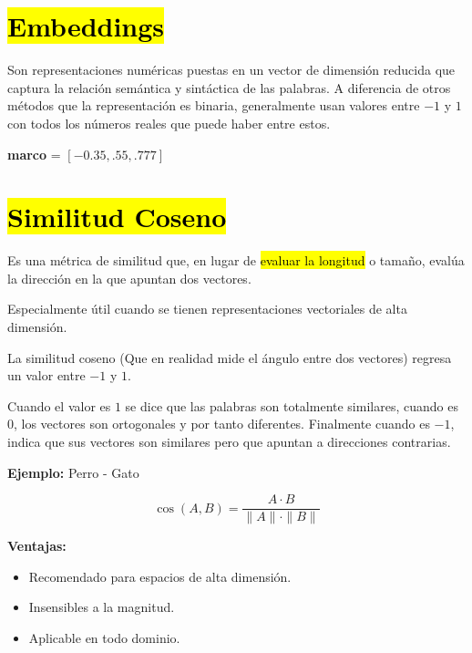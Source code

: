 \documentclass[12pt]{article}
\begin{document}
\section*{\hl{Embeddings}}

Son representaciones numéricas puestas en un vector de dimensión reducida que captura la relación semántica y sintáctica de las palabras. A diferencia de otros métodos que la representación es binaria, generalmente usan valores entre $-1$ y $1$ con todos los números reales que puede haber entre estos. 

\textbf{marco} = $[-0.35, .55, .777]$

\vspace{1em}

\section*{\hl{Similitud Coseno}}

Es una métrica de similitud que, en lugar de \hl{evaluar la longitud} o tamaño, evalúa la dirección en la que apuntan dos vectores.

Especialmente útil cuando se tienen representaciones vectoriales de alta dimensión.

\vspace{1em}

\begin{minipage}[t]{0.5\textwidth}
    La similitud coseno (Que en realidad mide el ángulo entre dos vectores) regresa un valor entre $-1$ y $1$.
    
    \vspace{1em}
    Cuando el valor es $1$ se dice que las palabras son totalmente similares, cuando es $0$, los vectores son ortogonales y por tanto diferentes. Finalmente cuando es $-1$, indica que sus vectores son similares pero que apuntan a direcciones contrarias.
    
    \vspace{1em}
    \textbf{Ejemplo:} Perro - Gato
\end{minipage}
\hfill
\begin{minipage}[t]{0.4\textwidth}
    \centering
    \[ \cos(A, B) = \frac{A \cdot B}{\|A\| \cdot \|B\|} \]
    
    \flushleft
    \textbf{Ventajas:}
    \begin{itemize}
        \item Recomendado para espacios de alta dimensión.
        \item Insensibles a la magnitud.
        \item Aplicable en todo dominio.
    \end{itemize}
\end{minipage}
\end{document}
